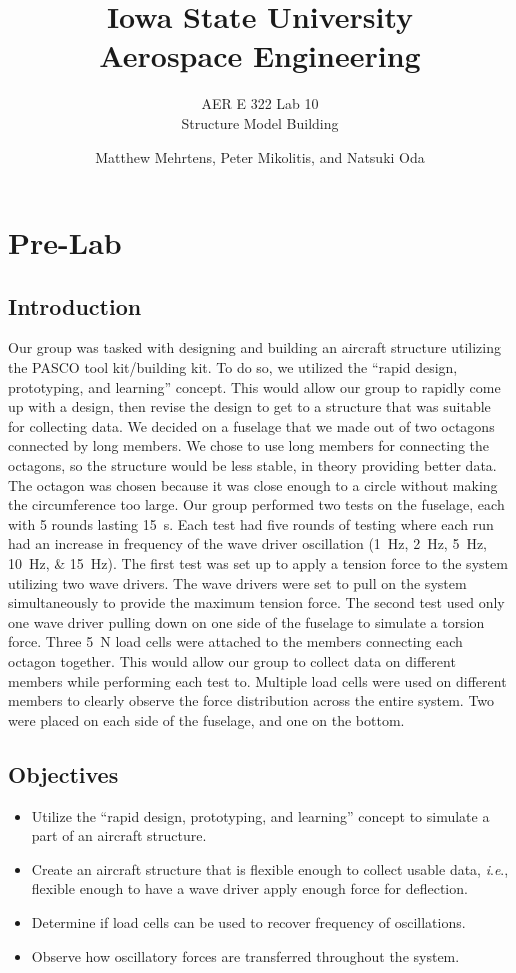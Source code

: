 \documentclass[12 pt]{report}
\title{\textbf{Iowa State University
\\{\Large Aerospace Engineering}}}
\subtitle{AER E 322 Lab 10\\
		  Structure Model Building}
\author{Matthew Mehrtens, Peter Mikolitis, and Natsuki Oda}
\newcommand{\ie}{\textit{i}.\textit{e}., }
\begin{document}
\maketitle
\tableofcontents

\chapter{Pre-Lab} \label{pre-lab}
\section{Introduction} \label{introduction}
Our group was tasked with designing and building an aircraft structure utilizing the PASCO tool kit/building kit. To do so, we utilized the ``rapid design, prototyping, and learning'' concept. This would allow our group to rapidly come up with a design, then revise the design to get to a structure that was suitable for collecting data. We decided on a fuselage that we made out of two octagons connected by long members. We chose to use long members for connecting the octagons, so the structure would be less stable, in theory providing better data. The octagon was chosen because it was close enough to a circle without making the circumference too large. Our group performed two tests on the fuselage, each with \num{5} rounds lasting \qty{15}{\second}. Each test had five rounds of testing where each run had an increase in frequency of the wave driver oscillation (\qtylist{1;2;5;10;15}{\hertz}). The first test was set up to apply a tension force to the system utilizing two wave drivers. The wave drivers were set to pull on the system simultaneously to provide the maximum tension force. The second test used only one wave driver pulling down on one side of the fuselage to simulate a torsion force. Three \qty{5}{\newton} load cells were attached to the members connecting each octagon together. This would allow our group to collect data on different members while performing each test to. Multiple load cells were used on different members to clearly observe the force distribution across the entire system. Two were placed on each side of the fuselage, and one on the bottom.

\section{Objectives} \label{objectives}
\begin{itemize}
	\item Utilize the ``rapid design, prototyping, and learning'' concept to simulate a part of an aircraft structure.
	\item Create an aircraft structure that is flexible enough to collect usable data, \ie flexible enough to have a wave driver apply enough force for deflection.
	\item Determine if load cells can be used to recover frequency of oscillations.
	\item Observe how oscillatory forces are transferred throughout the system.
\end{itemize}
\end{document}
